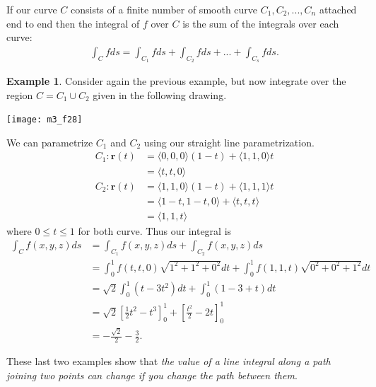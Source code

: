 \documentclass[12pt, letter]{article}
\theoremstyle{plain}
\numberwithin{theorem}{section}
\theoremstyle{definition}
\newtheorem{example}[theorem]{Example}
\begin{document}
\hrulefill

\bigskip

If our curve $C$ consists of a finite number of smooth curve $C_1, C_2, ..., C_n$ attached end to end then the integral of $f$ over $C$ is the sum of the integrals over each curve:
\begin{align*}
\int_C fds = \int_{C_1} fds + \int_{C_2} fds + ... + \int_{C_s} fds.
\end{align*}

\bigskip

\hrulefill

\bigskip

\begin{example}
Consider again the previous example, but now integrate over the region $C=C_1 \cup C_2$ given in the following drawing.

\bigskip

\begin{center}
\texttt{[image: m3\_f28]}
\end{center}

\bigskip

We can parametrize $C_1$ and $C_2$ using our straight line parametrization.
\begin{align*}
C_1: \bm{r}(t) &= \langle 0,0,0 \rangle (1-t) + \langle 1,1,0 \rangle t\\
&= \langle t,t,0 \rangle\\
C_2: \bm{r}(t) &= \langle 1,1,0 \rangle (1-t) + \langle 1,1,1 \rangle t\\
&= \langle 1-t, 1-t, 0 \rangle + \langle t,t,t \rangle\\
&= \langle 1,1, t \rangle
\end{align*}
where $0\leq t\leq 1$ for both curve. Thus our integral is
\begin{align*}
\int_C f(x,y,z)ds &= \int_{C_1} f(x,y,z)ds + \int_{C_2} f(x,y,z)ds\\
&= \int_0^1 f(t,t,0)\sqrt{1^2+1^2+0^2}dt+\int_0^1f(1,1,t)\sqrt{0^2+0^2+1^2}dt\\
&= \sqrt{2}\int_0^1 (t-3t^2)dt + \int_0^1 (1-3+t)dt\\
&= \sqrt{2}\left[\frac{1}{2}t^2-t^3\right]_0^1 + \left[\frac{t^2}{2}-2t\right]_0^1\\
&= -\frac{\sqrt{2}}{2} - \frac{3}{2}.
\end{align*}

\end{example}

These last two examples show that \textit{the value of a line integral along a path joining two points can change if you change the path between them}.
\end{document}
